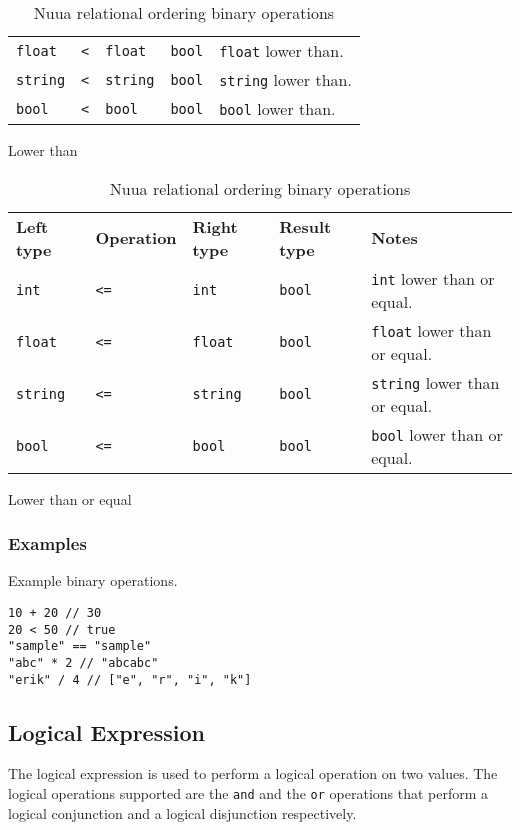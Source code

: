 \begin{table}[H]
\begin{subtable}{\textwidth}
\begin{tabular}{ l l l l p{9.5cm} }
            \texttt{float} & \texttt{<} & \texttt{float} & \texttt{bool} & \texttt{float} lower than.\\
            \texttt{string} & \texttt{<} & \texttt{string} & \texttt{bool} & \texttt{string} lower than.\\
            \texttt{bool} & \texttt{<} & \texttt{bool} & \texttt{bool} & \texttt{bool} lower than.\\
		\end{tabular}
		\caption{Lower than}
	\end{subtable}
    \begin{subtable}{\textwidth}
		\centering
        \begin{tabular}{ l l l l p{9.5cm} }
            \textbf{Left type} & \textbf{Operation} & \textbf{Right type} & \textbf{Result type} & \textbf{Notes} \\
            \texttt{int} & \texttt{<=} & \texttt{int} & \texttt{bool} & \texttt{int} lower than or equal.\\
            \texttt{float} & \texttt{<=} & \texttt{float} & \texttt{bool} & \texttt{float} lower than or equal.\\
            \texttt{string} & \texttt{<=} & \texttt{string} & \texttt{bool} & \texttt{string} lower than or equal.\\
            \texttt{bool} & \texttt{<=} & \texttt{bool} & \texttt{bool} & \texttt{bool} lower than or equal.\\
		\end{tabular}
		\caption{Lower than or equal}
	\end{subtable}
	\caption{Nuua relational ordering binary operations}
    \label{fig:nuua_relational_ordering_bin_ops}
\end{table}

\subsubsection{Examples}

Example binary operations.
\begin{lstlisting}
10 + 20 // 30
20 < 50 // true
"sample" == "sample"
"abc" * 2 // "abcabc"
"erik" / 4 // ["e", "r", "i", "k"]
\end{lstlisting}

\subsection{Logical Expression}

The logical expression is used to perform a logical operation on two values. The logical operations supported are
the \texttt{and} and the \texttt{or} operations that perform a logical conjunction and a logical disjunction respectively.

